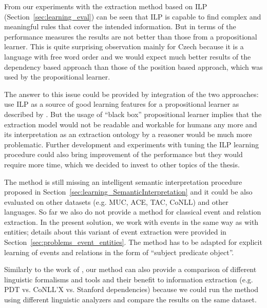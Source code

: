 From our experiments with the extraction method based on ILP (Section~\ref{sec:learning_eval}) can be seen that ILP is capable to find complex and meaningful rules that cover the intended information. But in terms of the performance measures the results are not better than those from a propositional learner. This is quite surprising observation mainly for Czech because it is a language with free word order and we would expect much better results of the dependency based approach than those of the position based approach, which was used by the propositional learner.

The answer to this issue could be provided by integration of the two approaches: use ILP as a source of good learning features for a propositional learner as described by \cite{DBLP:conf/ilp/RamakrishnanJBS07}. But the usage of ``black box'' propositional learner implies that the extraction model would not be readable and workable for humans any more and its interpretation as an extraction ontology by a reasoner would be much more problematic. Further development and experiments with tuning the ILP learning procedure could also bring improvement of the performance but they would require more time, which we decided to invest to other topics of the thesis.

The method is still missing an intelligent semantic interpretation procedure proposed in Section~\ref{sec:learning_SemanticInterpretation} and it could be also evaluated on other datasets (e.g. MUC, ACE, TAC, CoNLL) and other languages. So far we also do not provide a method for classical event and relation extraction. %
In the present solution, we work with events in the same way as with entities; details about this variant of event extraction were provided in Section~\ref{sec:problems_event_entities}. The method has to be adapted for explicit learning of events and relations in the form of ``subject predicate object''.

Similarly to the work of \cite{Buyko:2010:EIA:1870658.1870754}, our method can also provide a comparison of different linguistic formalisms and tools and their benefit to information extraction (e.g. PDT vs. CoNLL'X vs. Stanford dependencies) because we could run the method using different linguistic analyzers and compare the results on the same dataset.



